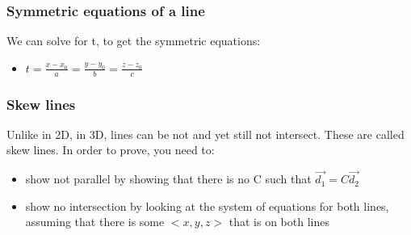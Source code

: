 \documentclass{beamer}
\begin{document}
\begin{frame}
  \frametitle{Symmetric equations of a line}
  We can solve for t, to get the symmetric equations:
  \begin{itemize}
  \item $t = \frac{x - x_0}{a} = \frac{y - y_0}{b} = \frac{z - z_0}{c}$
  \end{itemize}
\end{frame}

\begin{frame}
  \frametitle{Skew lines}
  Unlike in 2D, in 3D, lines can be not and yet still not intersect. These are called skew lines. In order to prove, you need to:
  \begin{itemize}
  \item show not parallel by showing that there is no C such that $\vec{d_1} = C\vec{d_2}$
  \item show no intersection by looking at the system of equations for both lines, assuming that there is some $<x, y, z>$ that is on both lines
  \end{itemize}
\end{frame}
\end{document}
